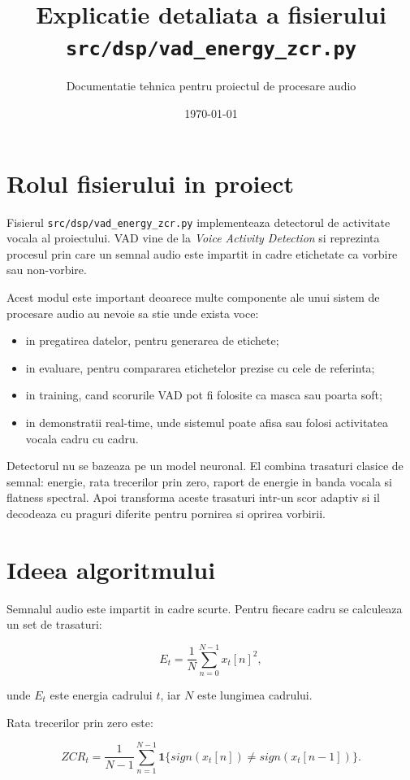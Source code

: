 \documentclass[12pt,a4paper]{report}
\title{Explicatie detaliata a fisierului \texttt{src/dsp/vad\_energy\_zcr.py}}
\author{Documentatie tehnica pentru proiectul de procesare audio}
\date{\today}
\begin{document}
\maketitle
\tableofcontents

\chapter{Rolul fisierului in proiect}

Fisierul \texttt{src/dsp/vad\_energy\_zcr.py} implementeaza detectorul de activitate vocala al proiectului. VAD vine de la \emph{Voice Activity Detection} si reprezinta procesul prin care un semnal audio este impartit in cadre etichetate ca vorbire sau non-vorbire.

Acest modul este important deoarece multe componente ale unui sistem de procesare audio au nevoie sa stie unde exista voce:

\begin{itemize}
    \item in pregatirea datelor, pentru generarea de etichete;
    \item in evaluare, pentru compararea etichetelor prezise cu cele de referinta;
    \item in training, cand scorurile VAD pot fi folosite ca masca sau poarta soft;
    \item in demonstratii real-time, unde sistemul poate afisa sau folosi activitatea vocala cadru cu cadru.
\end{itemize}

Detectorul nu se bazeaza pe un model neuronal. El combina trasaturi clasice de semnal: energie, rata trecerilor prin zero, raport de energie in banda vocala si flatness spectral. Apoi transforma aceste trasaturi intr-un scor adaptiv si il decodeaza cu praguri diferite pentru pornirea si oprirea vorbirii.

\chapter{Ideea algoritmului}

Semnalul audio este impartit in cadre scurte. Pentru fiecare cadru se calculeaza un set de trasaturi:

\[
E_t = \frac{1}{N}\sum_{n=0}^{N-1} x_t[n]^2,
\]

unde \(E_t\) este energia cadrului \(t\), iar \(N\) este lungimea cadrului.

Rata trecerilor prin zero este:

\[
ZCR_t = \frac{1}{N-1}\sum_{n=1}^{N-1}
\mathbf{1}\{sign(x_t[n]) \neq sign(x_t[n-1])\}.
\]
\end{document}
